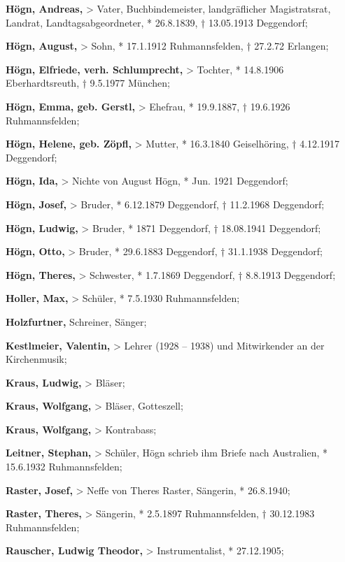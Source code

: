 \documentclass[a4paper]{article}
\begin{document}
\textbf{Högn, Andreas,} {\textgreater} Vater, Buchbindemeister,
landgräflicher Magistratsrat, Landrat, Landtagsabgeordneter, *
26.8.1839, † 13.05.1913 Deggendorf;

\textbf{Högn, August,} {\textgreater} Sohn, * 17.1.1912 Ruhmannsfelden,
† 27.2.72 Erlangen;

\textbf{Högn, Elfriede, verh. Schlumprecht, }{\textgreater} Tochter, *
14.8.1906 Eberhardtsreuth, † 9.5.1977 München;

\textbf{Högn, Emma, geb. Gerstl,} {\textgreater} Ehefrau, * 19.9.1887, †
19.6.1926 Ruhmannsfelden;

\textbf{Högn, Helene, geb. Zöpfl,} {\textgreater} Mutter, * 16.3.1840
Geiselhöring, † 4.12.1917 Deggendorf;

\textbf{Högn, Ida,} {\textgreater} Nichte von August Högn, * Jun. 1921
Deggendorf;

\textbf{Högn, Josef,} {\textgreater} Bruder, * 6.12.1879 Deggendorf, †
11.2.1968 Deggendorf;

\textbf{Högn, Ludwig, }{\textgreater} Bruder,\textbf{ }* 1871
Deggendorf, † 18.08.1941 Deggendorf;

\textbf{Högn, Otto,} {\textgreater} Bruder, * 29.6.1883 Deggendorf, †
31.1.1938 Deggendorf;

\textbf{Högn, Theres,} {\textgreater} Schwester, * 1.7.1869 Deggendorf,
† 8.8.1913 Deggendorf;

\textbf{Holler, Max,} {\textgreater} Schüler, * 7.5.1930 Ruhmannsfelden;

\textbf{Holzfurtner,} Schreiner, Sänger;

\textbf{Kestlmeier, Valentin,} {\textgreater} Lehrer (1928 – 1938) und
Mitwirkender an der Kirchenmusik;

\textbf{Kraus, Ludwig,} {\textgreater} Bläser;

\textbf{Kraus, Wolfgang,} {\textgreater} Bläser, Gotteszell;

\textbf{Kraus, Wolfgang,} {\textgreater} Kontrabass;

\textbf{Leitner, Stephan,} {\textgreater} Schüler, Högn schrieb ihm
Briefe nach Australien, * 15.6.1932 Ruhmannsfelden;

\textbf{Raster, Josef,} {\textgreater} Neffe von Theres Raster,
Sängerin, * 26.8.1940;

\textbf{Raster, Theres,} {\textgreater} Sängerin, * 2.5.1897
Ruhmannsfelden, † 30.12.1983 Ruhmannsfelden;

\textbf{Rauscher, Ludwig Theodor,} {\textgreater} Instrumentalist, *
27.12.1905;
\end{document}

